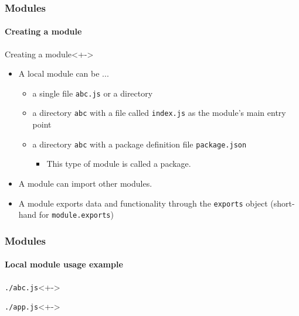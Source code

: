 \begin{frame}
	\frametitle{Modules}
    \framesubtitle{Creating a module}

	\begin{block}{Creating a module}<+->
		\begin{itemize}[<+-| highlight@+>]
            \item A local module can be ...
            \begin{itemize}[<+-| highlight@+>]
                \item a single file \texttt{abc.js} or a directory
                \item a directory \texttt{abc} with a file called \texttt{index.js} as the module's main entry point
                \item a directory \texttt{abc} with a package definition file \texttt{package.json}
                \begin{itemize}[<+-| highlight@+>]
                    \item This type of module is called a \alert{package}.
                \end{itemize}
            \end{itemize}
            \item A module can import other modules.
            \item A module exports data and functionality through the \texttt{exports} object (short-hand for \texttt{module.exports})
		\end{itemize}
	\end{block}
\end{frame}


\begin{frame}
	\frametitle{Modules}
    \framesubtitle{Local module usage example}

    \begin{block}{\texttt{./abc.js}}<+->
		
	\end{block}

    \begin{block}{\texttt{./app.js}}<+->
		
	\end{block}
\end{frame}


